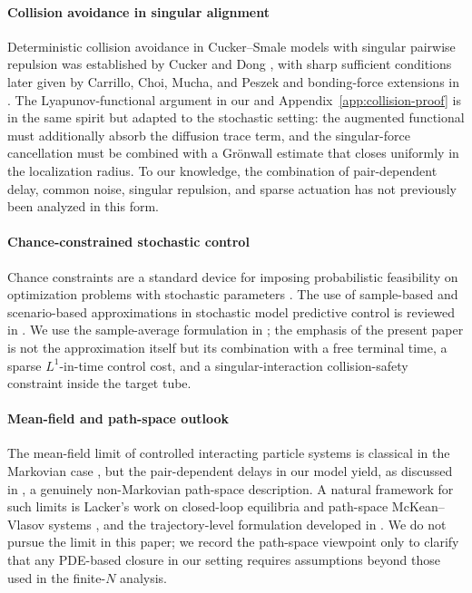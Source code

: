 \documentclass[pdflatex,sn-mathphys-num]{sn-jnl}%
\numberwithin{equation}{section}
\theoremstyle{thmstyleone}%
\theoremstyle{remark}
\theoremstyle{definition}
\begin{document}
\paragraph{Collision avoidance in singular alignment}

Deterministic collision avoidance in Cucker--Smale models with singular
pairwise repulsion was established by Cucker and Dong
\cite{cucker2010avoiding}, with sharp sufficient conditions later given by
Carrillo, Choi, Mucha, and Peszek \cite{carrillo2017sharp} and
bonding-force extensions in \cite{park2010cucker}. The
Lyapunov-functional argument in our  and
Appendix~\ref{app:collision-proof} is in the same spirit but adapted to the
stochastic setting: the augmented functional must additionally absorb the
diffusion trace term, and the singular-force cancellation must be combined
with a Gr\"onwall estimate that closes uniformly in the localization radius.
To our knowledge, the combination of pair-dependent delay, common noise,
singular repulsion, and sparse actuation has not previously been analyzed in
this form.

\paragraph{Chance-constrained stochastic control}

Chance constraints are a standard device for imposing probabilistic
feasibility on optimization problems with stochastic parameters
\cite{banerjea1998stochastic,nemirovski2007convex}. The use of sample-based and
scenario-based approximations in stochastic model predictive control is reviewed in
\cite{mesbah2016stochastic}. We use the sample-average formulation in
; the emphasis of the present paper is not
the approximation itself but its combination with a free terminal time, a
sparse $L^1$-in-time control cost, and a singular-interaction collision-safety
constraint inside the target tube.

\paragraph{Mean-field and path-space outlook}

The mean-field limit of controlled interacting particle systems is classical
in the Markovian case
\cite{fornasier2014mean,carmona2018probabilistic,bongini2017mean}, but
the pair-dependent delays in our model yield, as discussed in
, a genuinely non-Markovian path-space description. A
natural framework for such limits is Lacker's work on closed-loop equilibria
and path-space McKean--Vlasov systems \cite{lacker2020convergence}, and the
trajectory-level formulation developed in
\cite{carmona2018probabilistic,carrillo2010asymptotic,ha2008particle}. We do
not pursue the limit in this paper; we record the path-space viewpoint only
to clarify that any PDE-based closure in our setting requires assumptions
beyond those used in the finite-$N$ analysis.
\end{document}
